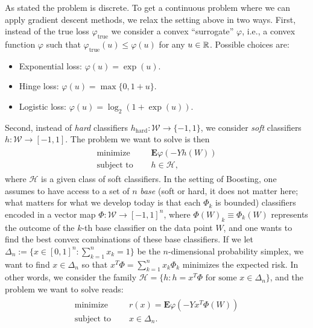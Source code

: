 As stated the problem is discrete. To get a continuous problem where we can apply gradient descent methods, we relax the setting above in two ways. First, instead of the true loss $\varphi_\text{true}$ we consider a convex ``surrogate'' $\varphi$, i.e., a convex function $\varphi$ such that $\varphi_\text{true}(u)\le\varphi(u)$ for any $u\in\mathbb{R}$. Possible choices are:
\begin{itemize}
\item Exponential loss: $\varphi(u) = \exp(u)$.
\item Hinge loss: $\varphi(u) = \max\{0,1+u\}$.
\item Logistic loss: $\varphi(u) = \log_2(1+\exp(u))$.
\end{itemize}
Second, instead of \emph{hard} classifiers $h_\text{hard}:\mathcal{W} \rightarrow \{-1,1\}$, we consider \emph{soft} classifiers $h:\mathcal{W} \rightarrow [-1,1]$. The problem we want to solve is then
\begin{align*}
	\begin{aligned}
		\text{minimize }\quad   & \mathbf{E} \varphi(-Yh(W))\\
		\text{subject to }\quad & h\in\mathcal{H},
	\end{aligned}
\end{align*}
where $\mathcal{H}$ is a given class of soft classifiers. In the setting of Boosting, one assumes to have access to a set of $n$ \emph{base} (soft or hard, it does not matter here; what matters for what we develop today is that each $\Phi_k$ is bounded) classifiers encoded in a vector map $\Phi:\mathcal{W} \rightarrow [-1,1]^n$, where $\Phi(W)_k\equiv \Phi_k(W)$ represents the outcome of the $k$-th base classifier on the data point $W$, and one wants to find the best convex combinations of these base classifiers. If we let $\Delta_n := \{x\in [0,1]^n : \sum_{k=1}^n x_k = 1\}$ be the $n$-dimensional probability simplex, we want to find $x\in\Delta_n$ so that $x^T\Phi=\sum_{k=1}^nx_k\Phi_k$ minimizes the expected risk. In other words, we consider the family $\mathcal{H}=\{h : h=x^T\Phi \text{ for some }x\in\Delta_n\}$, and the problem we want to solve reads:
\begin{align*}
	\begin{aligned}
		\text{minimize }\quad   & r(x) = \mathbf{E} \varphi(-Yx^T\Phi(W))\\
		\text{subject to }\quad & x\in \Delta_n.
	\end{aligned}
\end{align*}



